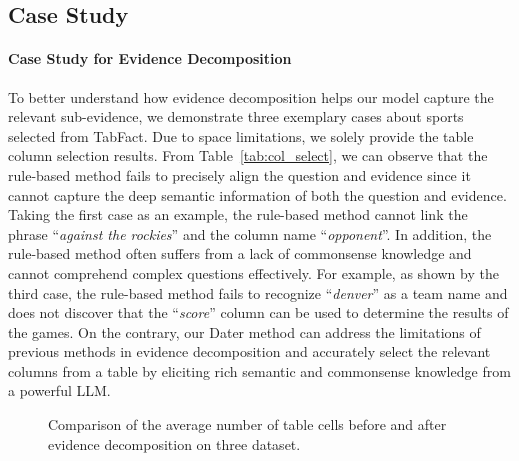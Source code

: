 \documentclass{article}
\begin{document}
\subsection{Case Study}
\paragraph{Case Study for Evidence Decomposition}
To better understand how evidence decomposition helps our model capture the relevant sub-evidence, we demonstrate 
three exemplary cases about sports selected from TabFact. Due to space limitations, we solely provide the table column selection results. From Table~\ref{tab:col_select}, we can observe that the rule-based method fails to precisely align the question and evidence since it cannot capture the deep semantic information of both the question and evidence. Taking the first case as an example, the rule-based method cannot link the phrase ``\textit{against the rockies}'' and the column name ``\textit{opponent}''.  In addition, the rule-based method often suffers from a lack of commonsense knowledge and cannot comprehend complex questions effectively. For example, as shown by the third case, the rule-based method fails to recognize ``\textit{denver}'' as a team name and does not discover that the ``\textit{score}'' column can be used to determine the results of the games. 
On the contrary, our Dater method can address the limitations of previous methods in evidence decomposition and accurately select the relevant columns from a table by eliciting rich semantic and commonsense knowledge from a powerful LLM. 

\begin{wrapfigure}{l}{0.5\textwidth}
\caption{Comparison of the average number of table cells before and after evidence decomposition on three dataset.}
\label{fig:table_cell}
\end{wrapfigure}
\end{document}
